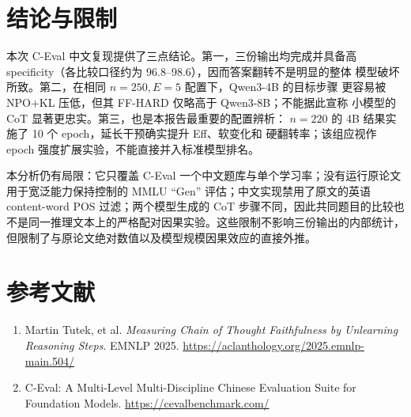 \documentclass[UTF8,fontset=fandol,10pt,a4paper]{ctexart}
\begin{document}
\section{结论与限制}
本次 C-Eval 中文复现提供了三点结论。第一，三份输出均完成并具备高
specificity（各比较口径约为 96.8--98.6），因而答案翻转不是明显的整体
模型破坏所致。第二，在相同 \(n=250,E=5\) 配置下，Qwen3-4B 的目标步骤
更容易被 NPO+KL 压低，但其 FF-HARD 仅略高于 Qwen3-8B；不能据此宣称
小模型的 CoT 显著更忠实。第三，也是本报告最重要的配置辨析：
\(n=220\) 的 4B 结果实施了 10 个 epoch，延长干预确实提升 Eff、软变化和
硬翻转率；该组应视作 epoch 强度扩展实验，不能直接并入标准模型排名。

本分析仍有局限：它只覆盖 C-Eval 一个中文题库与单个学习率；没有运行原论文
用于宽泛能力保持控制的 MMLU ``Gen'' 评估；中文实现禁用了原文的英语
content-word POS 过滤；两个模型生成的 CoT 步骤不同，因此共同题目的比较也
不是同一推理文本上的严格配对因果实验。这些限制不影响三份输出的内部统计，
但限制了与原论文绝对数值以及模型规模因果效应的直接外推。

\section*{参考文献}
\begin{enumerate}
  \item Martin Tutek, et al. \textit{Measuring Chain of Thought Faithfulness
  by Unlearning Reasoning Steps}. EMNLP 2025.
  \url{https://aclanthology.org/2025.emnlp-main.504/}
  \item C-Eval: A Multi-Level Multi-Discipline Chinese Evaluation Suite for
  Foundation Models. \url{https://cevalbenchmark.com/}
\end{enumerate}
\end{document}
